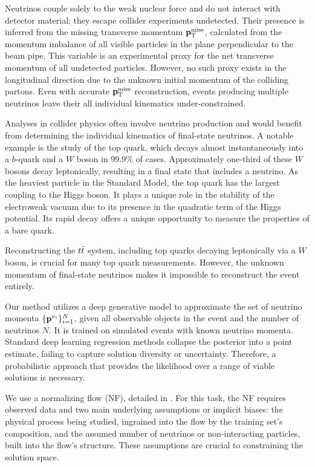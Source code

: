 Neutrinos couple solely to the weak nuclear force and do not interact with detector material; they escape collider experiments undetected.
Their presence is inferred from the missing transverse momentum $\mathbf{p}_{\text{T}}^{\text{miss}}$, calculated from the momentum imbalance of all visible particles in the plane perpendicular to the beam pipe.
This variable is an experimental proxy for the net transverse momentum of all undetected particles.
However, no such proxy exists in the longitudinal direction due to the unknown initial momentum of the colliding partons.
Even with accurate $\mathbf{p}_{\text{T}}^{\text{miss}}$ reconstruction, events producing multiple neutrinos leave their all individual kinematics under-constrained.

Analyses in collider physics often involve neutrino production and would benefit from determining the individual kinematics of final-state neutrinos.
A notable example is the study of the top quark, which decays almost instantaneously into a $b$-quark and a $W$ boson in 99.9\% of cases.
Approximately one-third of these $W$ bosons decay leptonically, resulting in a final state that includes a neutrino.
As the heaviest particle in the Standard Model, the top quark has the largest coupling to the Higgs boson.
It plays a unique role in the stability of the electroweak vacuum due to its presence in the quadratic term of the Higgs potential.
Its rapid decay offers a unique opportunity to measure the properties of a bare quark.

Reconstructing the $t\bar{t}$ system, including top quarks decaying leptonically via a $W$ boson, is crucial for many top quark measurements.
However, the unknown momentum of final-state neutrinos makes it impossible to reconstruct the event entirely.

Our method utilizes a deep generative model to approximate the set of neutrino momenta $\{\mathbf{p}^{\nu_i}\}_{i=1}^N$, given all observable objects in the event and the number of neutrinos $N$.
It is trained on simulated events with known neutrino momenta.
Standard deep learning regression methods collapse the posterior into a point estimate, failing to capture solution diversity or uncertainty.
Therefore, a probabilistic approach that provides the likelihood over a range of viable solutions is necessary.

We use a normalizing flow (NF), detailed in .
For this task, the NF requires observed data and two main underlying assumptions or implicit biases: the physical process being studied, ingrained into the flow by the training set's composition, and the assumed number of neutrinos or non-interacting particles, built into the flow's structure.
These assumptions are crucial to constraining the solution space.

